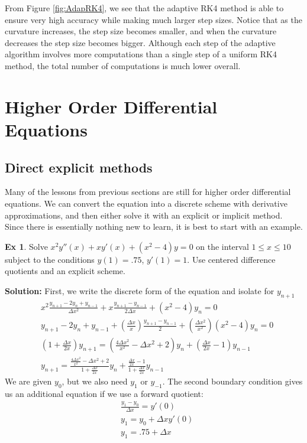 \documentclass[]{article}
\theoremstyle{definition}
\newtheorem{exmp}{Ex}[section]
\numberwithin{equation}{section}
\begin{document}
	From Figure \ref{fig:AdapRK4}, we see that the adaptive RK4 method is able to ensure very high accuracy while making much larger step sizes. Notice that as the curvature increases, the step size becomes smaller, and when the curvature decreases the step size becomes bigger. Although each step of the adaptive algorithm involves more computations than a single step of a uniform RK4 method, the total number of computations is much lower overall.
		
	
	\section{Higher Order Differential Equations}
	\subsection{Direct explicit methods}
	Many of the lessons from previous sections are still for higher order differential equations. We can convert the equation into a discrete scheme with derivative approximations, and then either solve it with an explicit or implicit method. Since there is essentially nothing new to learn, it is best to start with an example.
	\begin{exmp}
		Solve $x^2y''(x) + xy'(x) + (x^2-4)y = 0$ on the interval $ 1 \leq x \leq 10 $ subject to the conditions $y(1) = .75$, $y'(1) = 1$. Use centered difference quotients and an explicit scheme.
	\end{exmp}
	\textbf{Solution:} First, we write the discrete form of the equation and isolate for $y_{n+1}$
	\begin{align*}
		&x^2 \frac{y_{n+1} - 2y_n + y_{n-1}}{\Delta x^2} + x \frac{y_{n+1}-y_{n-1}}{2\Delta x} + (x^2-4)y_n = 0 \\
		&y_{n+1} - 2y_n + y_{n-1}  + \left(\frac{\Delta x}{x}\right) \frac{y_{n+1}-y_{n-1}}{2} + \left(\frac{\Delta x^2}{x^2}\right)(x^2 - 4) y_n = 0 \\
		&\left(1 + \frac{\Delta x}{2x}\right)y_{n+1} = \left(\frac{4\Delta x^2}{x^2}-\Delta x^2 + 2\right) y_n + \left(\frac{\Delta x}{2x} -1 \right) y_{n-1} \\
		&y_{n+1} = \frac{\frac{4\Delta x^2}{x^2}-\Delta x^2 + 2}{1 + \frac{\Delta x}{2x}} y_n + \frac{\frac{\Delta x}{2x} -1}{1 + \frac{\Delta x}{2x}}y_{n-1}
	\end{align*}
	We are given $y_0$, but we also need $y_1$ or $y_{-1}$. The second boundary condition gives us an additional equation if we use a forward quotient:
	\begin{align*}
	&\frac{y_1 - y_0 }{\Delta x} = y'(0) \\
	&y_1 = y_0 + \Delta x y'(0) \\
	&y_1 = .75 + \Delta x
	\end{align*}
\end{document}
